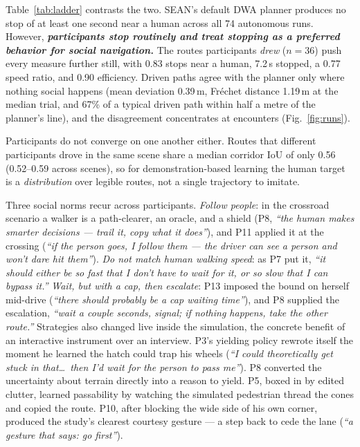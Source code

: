 Table~\ref{tab:ladder} contrasts the two. SEAN's default DWA planner produces no stop of at least one second near a human across all 74 autonomous runs. However, \textbf{\textit{participants stop routinely and treat stopping as a preferred behavior for social navigation.}} The routes participants \emph{drew} ($n{=}36$) push every measure further still, with 0.83 stops near a human, 7.2\,s stopped, a 0.77 speed ratio, and 0.90 efficiency. Driven paths agree with the planner only where nothing social happens (mean deviation 0.39\,m, Fr\'{e}chet distance 1.19\,m at the median trial, and 67\% of a typical driven path within half a metre of the planner's line), and the disagreement concentrates at encounters (Fig.~\ref{fig:runs}).

Participants do not converge on one another either. Routes that different participants drove in the same scene share a median corridor IoU of only 0.56 (0.52--0.59 across scenes), so for demonstration-based learning the human target is a \emph{distribution} over legible routes, not a single trajectory to imitate.

Three social norms recur across participants. \emph{Follow people}: in the crossroad scenario a walker is a path-clearer, an oracle, and a shield (P8, \emph{``the human makes smarter decisions --- trail it, copy what it does''}), and P11 applied it at the crossing (\emph{``if the person goes, I follow them --- the driver can see a person and won't dare hit them''}). \emph{Do not match human walking speed}: as P7 put it, \emph{``it should either be so fast that I don't have to wait for it, or so slow that I can bypass it.''} \emph{Wait, but with a cap, then escalate}: P13 imposed the bound on herself mid-drive (\emph{``there should probably be a cap waiting time''}), and P8 supplied the escalation, \emph{``wait a couple seconds, signal; if nothing happens, take the other route.''} Strategies also changed live inside the simulation, the concrete benefit of an interactive instrument over an interview. P3's yielding policy rewrote itself the moment he learned the hatch could trap his wheels (\emph{``I could theoretically get stuck in that\dots\ then I'd wait for the person to pass me''}). P8 converted the uncertainty about terrain directly into a reason to yield. P5, boxed in by edited clutter, learned passability by watching the simulated pedestrian thread the cones and copied the route. P10, after blocking the wide side of his own corner, produced the study's clearest courtesy gesture --- a step back to cede the lane (\emph{``a gesture that says: go first''}).

